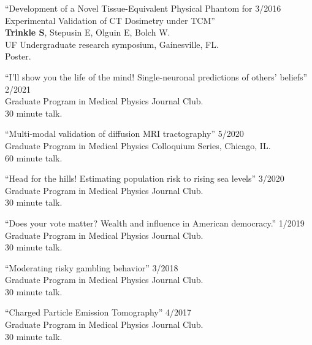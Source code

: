 \documentclass[10pt,letterpaper]{article}
\begin{document}
\begin{benumerate}{17}
\item{``Development of a Novel Tissue-Equivalent Physical Phantom for \hfill 3/2016\\
    Experimental Validation of CT Dosimetry under TCM'' \\
    \textbf{Trinkle S}, Stepusin E, Olguin E, Bolch W.\\
    UF Undergraduate research symposium, Gainesville, FL. \\
    Poster.}

\end{benumerate}

\begin{benumerate}{6}

\item {``I'll show you the life of the mind! Single-neuronal predictions of
    others' beliefs'' \hfill 2/2021\\
    Graduate Program in Medical Physics Journal Club. \\
    30 minute talk.
  }
\item{``Multi-modal validation of diffusion MRI tractography'' \hfill 5/2020\\
    Graduate Program in Medical Physics Colloquium Series, Chicago, IL.\\
    60 minute talk.}

\item{``Head for the hills! Estimating population risk to rising sea levels'' \hfill 3/2020\\
    Graduate Program in Medical Physics Journal Club. \\
    30 minute talk.}

\item{``Does your vote matter? Wealth and influence in American democracy.'' \hfill 1/2019\\
    Graduate Program in Medical Physics Journal Club. \\
    30 minute talk.}

\item{``Moderating risky gambling behavior'' \hfill 3/2018\\
    Graduate Program in Medical Physics Journal Club. \\
    30 minute talk.}
  
\item{``Charged Particle Emission Tomography'' \hfill 4/2017\\
    Graduate Program in Medical Physics Journal Club. \\
    30 minute talk.}

\end{benumerate}
\end{document}
